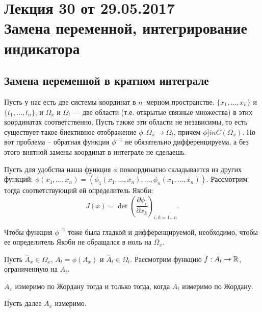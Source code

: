 \section{Лекция 30 от 29.05.2017 \\ Замена переменной, интегрирование индикатора}

\subsection{Замена переменной в кратном интеграле}
Пусть у нас есть две системы координат в $n$--мерном пространстве, $\{x_1, \ldots, x_n\}$ и $\{ t_1, \ldots, t_n \}$, и $\Omega_x$ и $\Omega_t$ --- две области (т.е. открытые связные множества) в этих координатах соответственно. Пусть также эти области не независимы, то есть существует такое биективное отображение $\phi: \Omega_x \to \Omega_t$, причем $\phi ]in C(\Omega_x)$. Но вот проблема -- обратная функция $\phi^{-1}$ не обязательно дифференцируема, а без этого внятной замены координат в интеграле не сделаешь.

Пусть для удобства наша функция $\phi$ покоординатно складывается из других функций: $\phi(x_1, \ldots, x_n) = (\phi_1(x_1, \ldots, x_n), \ldots, \phi_n(x_1, \ldots, x_n))$. Рассмотрим тогда соответствующий ей определитель Якоби:
$$
J(\overline x) = \det \left(\frac{\partial \phi_i}{\partial x_k} \right)_{i, k = 1 \ldots n}.
$$

\begin{Statement}
Чтобы функция $\phi^{-1}$ тоже была гладкой и дифференцируемой, необходимо, чтобы ее определитель Якоби не обращался в ноль на $\Omega_x$.
\end{Statement}

Пусть $\overline A_x \in \Omega_x$, $A_t = \phi(A_x)$ и $\overline A_t \in \Omega_t$. Рассмотрим функцию $f: A_t \to \mathbb{R}$, ограниченную на $A_t$.

\begin{Statement}
$A_x$ измеримо по Жордану тогда и только тогда, когда $A_t$ измеримо по Жордану.
\end{Statement}

Пусть далее $A_x$ измеримо.

